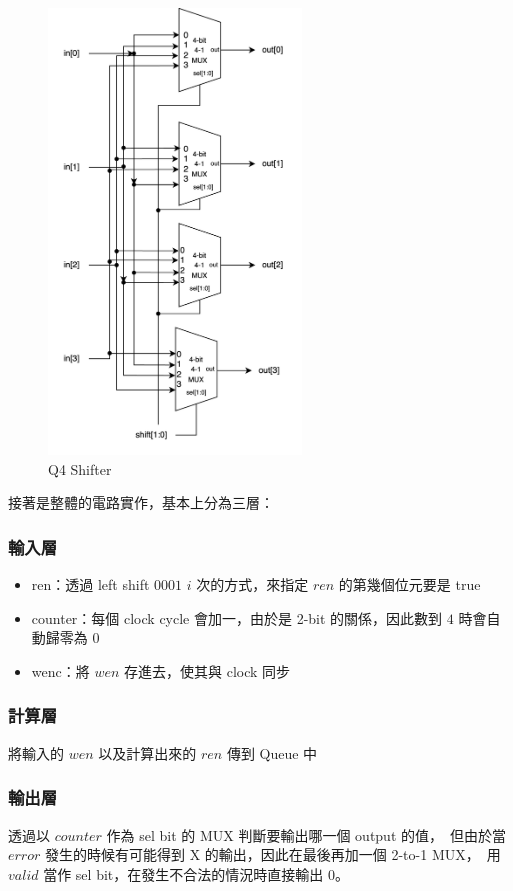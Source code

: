 \documentclass[10.5pt,compsoc,UTF8]{CjC}
\theoremstyle{mystyle}
\begin{document}
\begin{figure}[!h]
  \centering
  \includegraphics[width=0.6\textwidth]{./img/Q4-Shift.png}
  \caption{Q4 Shifter}
  \label{fig:Q4-shift}
\end{figure}

\newpage

接著是整體的電路實作，基本上分為三層：
\subsubsection*{輸入層}
\begin{itemize}
  \item ren：透過 left shift $0001$ $i$ 次的方式，來指定 $ren$ 的第幾個位元要是 true
  \item counter：每個 clock cycle 會加一，由於是 2-bit 的關係，因此數到 $4$ 時會自動歸零為 $0$
  \item wenc：將 $wen$ 存進去，使其與 clock 同步
\end{itemize}

\subsubsection*{計算層}
將輸入的 $wen$ 以及計算出來的 $ren$ 傳到 Queue 中

\subsubsection*{輸出層}
透過以 $counter$ 作為 sel bit 的 MUX 判斷要輸出哪一個 output 的值，\
但由於當 $error$ 發生的時候有可能得到 X 的輸出，因此在最後再加一個 2-to-1 MUX，\
用 $valid$ 當作 sel bit，在發生不合法的情況時直接輸出 $0$。
\end{document}
